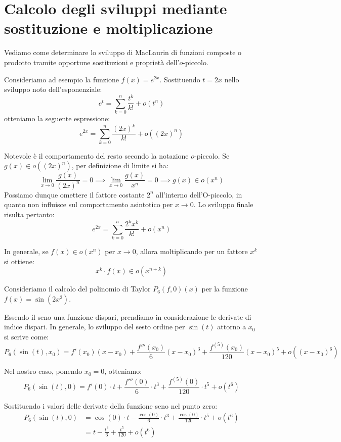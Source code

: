 \documentclass[12pt]{report}
\begin{document}
	\section{Calcolo degli sviluppi mediante sostituzione e moltiplicazione}
	
	Vediamo come determinare lo sviluppo di MacLaurin di funzioni composte o prodotto tramite opportune sostituzioni e proprietà dell'$o$-piccolo.
	
	Consideriamo ad esempio la funzione $f(x) = e^{2x}$. Sostituendo $t = 2x$ nello sviluppo noto dell'esponenziale:
	\[
	e^t = \sum_{k=0}^n \frac{t^k}{k!} + o(t^n)
	\]
	otteniamo la seguente espressione:
	\[
	e^{2x} = \sum_{k=0}^n \frac{(2x)^k}{k!} + o((2x)^n)
	\]
	
	Notevole è il comportamento del resto secondo la notazione $o$-piccolo. Se $g(x) \in o((2x)^n)$, per definizione di limite si ha:
	\[
	\lim_{x \to 0} \frac{g(x)}{(2x)^n} = 0 \implies \lim_{x \to 0} \frac{g(x)}{x^n} = 0 \implies g(x) \in o(x^n)
	\]
	Possiamo dunque omettere il fattore costante $2^n$ all'interno dell'O-piccolo, in quanto non influisce sul comportamento asintotico per $x \to 0$. Lo sviluppo finale risulta pertanto:
	\[
	e^{2x} = \sum_{k=0}^n \frac{2^k x^k}{k!} + o(x^n)
	\]
	
	\begin{proposizione}{}{}
		
		In generale, se $f(x) \in o(x^n)$ per $x \to 0$, allora moltiplicando per un fattore $x^k$ si ottiene:
		\[
		x^k \cdot f(x) \in o(x^{n+k})
		\]
		
	\end{proposizione}
	
	Consideriamo il calcolo del polinomio di Taylor $P_6(f, 0)(x)$ per la funzione $f(x) = \sin(2x^2)$.
	
	Essendo il seno una funzione dispari, prendiamo in considerazione le derivate di indice dispari. In generale, lo sviluppo del sesto ordine per $\sin(t)$ attorno a $x_0$ si scrive come:
	\[
	P_6(\sin(t), x_0) = f'(x_0)(x - x_0) + \frac{f'''(x_0)}{6}(x - x_0)^3 + \frac{f^{(5)}(x_0)}{120}(x - x_0)^5 + o((x - x_0)^6)
	\]
	
	Nel nostro caso, ponendo $x_0 = 0$, otteniamo:
	\[
	P_6(\sin(t), 0) = f'(0) \cdot t + \frac{f'''(0)}{6} \cdot t^3 + \frac{f^{(5)}(0)}{120} \cdot t^5 + o(t^6)
	\]
	
	Sostituendo i valori delle derivate della funzione seno nel punto zero:
	\[
	\begin{aligned}
		P_6(\sin(t), 0) &= \cos(0) \cdot t - \frac{\cos(0)}{6} \cdot t^3 + \frac{\cos(0)}{120} \cdot t^5 + o(t^6) \\
		&= t - \frac{t^3}{6} + \frac{t^5}{120} + o(t^6)
	\end{aligned}
	\]
	
\end{document}
